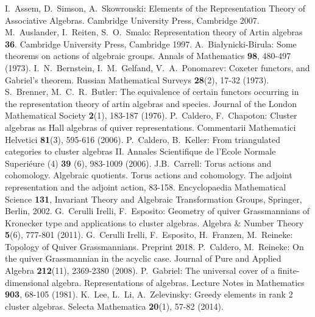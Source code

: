 \documentclass{amsart}
\numberwithin{equation}{section}
\begin{document}
\begin{thebibliography}{10}

  I.~Assem, D.~Simson, A.~Skowronski: Elements of the Representation Theory of Associative Algebras. Cambridge University Press, Cambridge 2007.
  M.~Auslander, I.~Reiten, S.~O.~Smalo: Representation theory of Artin algebras {\bf 36}. Cambridge University Press, Cambridge 1997.
  A.~Bia\l{}ynicki-Birula: Some theorems on actions of algebraic groups. Annals of Mathematics \textbf{98}, 480-497 (1973).
  I.~N.~Bernstein, I.~M.~Gelfand, V.~A.~Ponomarev: Coxeter functors, and Gabriel's theorem. Russian Mathematical Surveys \textbf{28}(2), 17-32 (1973).
  S.~Brenner, M.~C.~R.~Butler: The equivalence of certain functors occurring in the representation theory of artin algebras and species. Journal of the London Mathematical Society \textbf{2}(1), 183-187 (1976).
  P.~Caldero, F.~Chapoton: Cluster algebras as {H}all algebras of quiver representations. Commentarii Mathematici Helvetici \textbf{81}(3), 595-616 (2006).
  P.~Caldero, B.~Keller: From triangulated categories to cluster algebras II.  Annales Scientifique de l'Ecole Normale Superi\'{e}ure (4) \textbf{39} (6), 983-1009 (2006).
	J.B.~Carrell: Torus actions and cohomology. Algebraic quotients. Torus actions and cohomology. The adjoint representation and the adjoint action, 83-158. Encyclopaedia Mathematical Science \textbf{131}, Invariant Theory and Algebraic
Transformation Groups, Springer, Berlin, 2002.
  G.~Cerulli Irelli, F.~Esposito: Geometry of quiver Grassmannians of Kronecker type and applications to cluster algebras. Algebra \&  Number Theory \textbf{5}(6), 777-801 (2011).
  G.~Cerulli Irelli, F.~Esposito, H.~Franzen, M.~Reineke: Topology of Quiver Grassmannians. Preprint 2018.
  P.~Caldero, M.~Reineke: On the quiver Grassmannian in the acyclic case. Journal of Pure and Applied Algebra \textbf{212}(11), 2369-2380 (2008).
  P.~Gabriel: The universal cover of a finite-dimensional algebra. Representations of algebras. Lecture Notes in Mathematics {\bf 903}, 68-105 (1981).
  K.~Lee, L.~Li, A.~Zelevinsky: Greedy elements in rank 2 cluster algebras. Selecta Mathematica \textbf{20}(1), 57-82 (2014).

\end{thebibliography}
\end{document}
